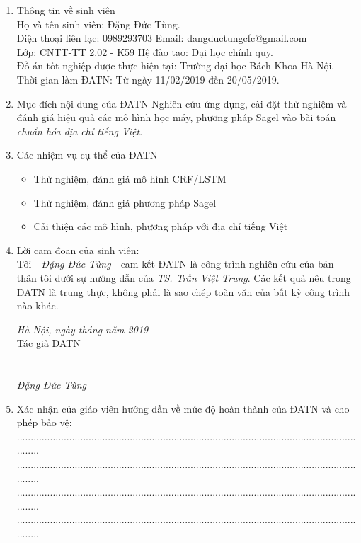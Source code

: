 \begin{enumerate}
\item Thông tin về sinh viên\\
Họ và tên sinh viên: Đặng Đức Tùng. \\
Điện thoại liên lạc: 0989293703   Email: dangductungcfc@gmail.com\\
Lớp: CNTT-TT 2.02 - K59 Hệ đào tạo: Đại học chính quy. \\
Đồ án tốt nghiệp được thực hiện tại:  Trường đại học Bách Khoa Hà Nội.\\
Thời gian làm ĐATN: Từ ngày 11/02/2019  đến  20/05/2019.
\item Mục đích nội dung của ĐATN \newline
Nghiên cứu ứng dụng, cài đặt thử nghiệm và đánh giá hiệu quả các mô hình học máy, phương pháp Sagel vào bài toán \textit{chuẩn hóa địa chỉ tiếng Việt}.
\item Các nhiệm vụ cụ thể của ĐATN 
\begin{itemize}
	\item Thử nghiệm, đánh giá mô hình CRF/LSTM 
	\item Thử nghiệm, đánh giá phương pháp Sagel
	\item Cải thiện các mô hình, phương pháp với địa chỉ tiếng Việt 
\end{itemize}
\item Lời cam đoan của sinh viên:\\
Tôi - \textit{Đặng Đức Tùng} - cam kết ĐATN là công trình nghiên cứu của bản thân tôi dưới sự hướng dẫn của  \textit{TS. Trần Việt Trung}. Các kết quả nêu trong ĐATN là trung thực, không phải là sao chép toàn văn của bất kỳ công trình nào khác.\\
\begin{flushright}
\vbox{
	\textit{Hà Nội, ngày \space \space \space tháng \space \space \space năm 2019}
	\\ Tác giả ĐATN~~~~~~~~~~~~~~~~
	\\~
	\\~
	\\ \textit{Đặng Đức Tùng ~~~~~~~~}
}
\end{flushright}

\item Xác nhận của giáo viên hướng dẫn về mức độ hoàn thành của ĐATN và cho phép bảo vệ:
\newline...................................................................................................................................
\newline...................................................................................................................................
\newline...................................................................................................................................
\newline...................................................................................................................................


\end{enumerate}
